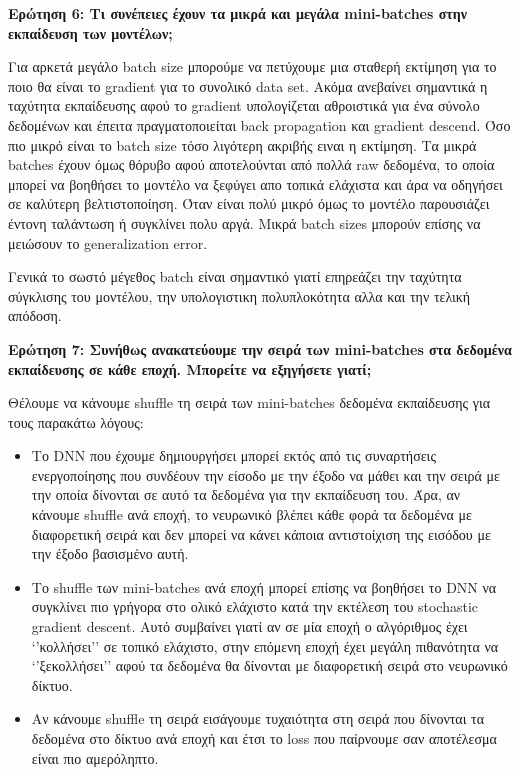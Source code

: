 \documentclass[12pt]{article}
\begin{document}
\textbf{Ερώτηση 6: Τι συνέπειες έχουν τα μικρά και μεγάλα mini-batches στην εκπαίδευση των μοντέλων;}

Για αρκετά μεγάλο batch size μπορούμε να πετύχουμε μια σταθερή εκτίμηση για το ποιο θα είναι το gradient για το συνολικό data set. Ακόμα ανεβαίνει σημαντικά η ταχύτητα εκπαίδευσης αφού το gradient υπολογίζεται αθροιστικά για ένα σύνολο δεδομένων και έπειτα πραγματοποιείται back propagation και gradient descend. Όσο πιο μικρό είναι το batch size τόσο λιγότερη ακριβής ειναι η εκτίμηση. Τα μικρά batches έχουν όμως θόρυβο αφού αποτελούνται από πολλά raw δεδομένα, το οποία μπορεί να βοηθήσει το μοντέλο να ξεφύγει απο τοπικά ελάχιστα και άρα να οδηγήσει σε καλύτερη βελτιστοποίηση. Όταν είναι πολύ μικρό όμως το μοντέλο παρουσιάζει έντονη ταλάντωση ή συγκλίνει πολυ αργά. Μικρά batch sizes μπορούν επίσης να μειώσουν το generalization error. 

Γενικά το σωστό μέγεθος batch είναι σημαντικό γιατί επηρεάζει την ταχύτητα σύγκλισης του μοντέλου, την υπολογιστικη πολυπλοκότητα αλλα και την τελική απόδοση. 

\textbf{Ερώτηση 7: Συνήθως ανακατεύουμε την σειρά των mini-batches στα δεδομένα εκπαίδευσης σε κάθε εποχή. Μπορείτε να εξηγήσετε γιατί;}

Θέλουμε να κάνουμε shuffle τη σειρά των mini-batches δεδομένα εκπαίδευσης για τους παρακάτω λόγους:

\begin{itemize}
    \item Το DNN που έχουμε δημιουργήσει μπορεί εκτός από τις συναρτήσεις ενεργοποίησης που συνδέουν την είσοδο με την έξοδο να μάθει και την σειρά με την οποία δίνονται σε αυτό τα δεδομένα για την εκπαίδευση του. Άρα, αν κάνουμε shuffle ανά εποχή, το νευρωνικό βλέπει κάθε φορά τα δεδομένα με διαφορετική σειρά και δεν μπορεί να κάνει κάποια αντιστοίχιση της εισόδου με την έξοδο βασισμένο αυτή.
    \item Το shuffle των mini-batches ανά εποχή μπορεί επίσης να βοηθήσει το DNN να συγκλίνει πιο γρήγορα στο ολικό ελάχιστο κατά την εκτέλεση του stochastic gradient descent. Αυτό συμβαίνει γιατί αν σε μία εποχή ο αλγόριθμος έχει ‘’κολλήσει’’ σε τοπικό ελάχιστο, στην επόμενη εποχή έχει μεγάλη πιθανότητα να ‘’ξεκολλήσει’’ αφού τα δεδομένα θα δίνονται με διαφορετική σειρά στο νευρωνικό δίκτυο.  
    \item Αν κάνουμε shuffle τη σειρά εισάγουμε τυχαιότητα στη σειρά που δίνονται τα δεδομένα στο δίκτυο ανά εποχή και έτσι το loss που παίρνουμε σαν αποτέλεσμα είναι πιο αμερόληπτο.
\end{itemize}
\end{document}
